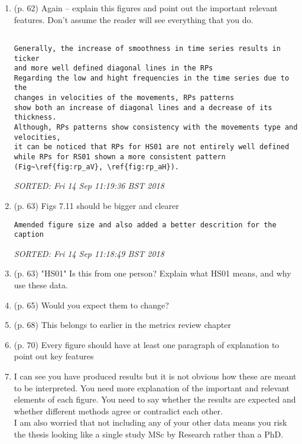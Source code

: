 \documentclass[10pt]{article}
\begin{document}
\begin{enumerate}[noitemsep,topsep=0pt]
\item (p. 62) Again -- explain this figures and point out the important 
	relevant features.
	Don't assume the reader will see everything that you do.


\begin{verbatim}

Generally, the increase of smoothness in time series results in ticker 
and more well defined diagonal lines in the RPs 
Regarding the low and hight frequencies in the time series due to the 
changes in velocities of the movements, RPs patterns
show both an increase of diagonal lines and a decrease of its thickness.
Although, RPs patterns show consistency with the movements type and velocities,
it can be noticed that RPs for HS01 are not entirely well defined
while RPs for RS01 shown a more consistent pattern
(Fig~\ref{fig:rp_aV}, \ref{fig:rp_aH}). 

\end{verbatim}
\textit{
SORTED: 
Fri 14 Sep 11:19:36 BST 2018
}
\\




\item (p. 63) Figs 7.11 should be bigger and clearer


\begin{verbatim}
Amended figure size and also added a better descrition for the caption
\end{verbatim}
\textit{
SORTED: 
Fri 14 Sep 11:18:49 BST 2018
}
\\






\item (p. 63) "HS01" Is this from one person? Explain what
	HS01 means, and why use these data.

\item (p. 65) Would you expect them to change?

\item (p. 68) This belongs to earlier in the metrics review chapter

\item (p. 70) Every figure should have at least one paragraph of explanation
	to point out key features 

\item I can see you have produced results 
	but it is not obvious how these are meant to be interpreted.
	You need more explanation of the important and relevant elements
	of each figure.
	You need to say whether the results are expected and
	whether different methods agree or contradict each other. \\
	I am also worried that not including any of  your other data
	means you risk the thesis looking like a single study 
	MSc by Research rather than a PhD.


\end{enumerate}
\end{document}

